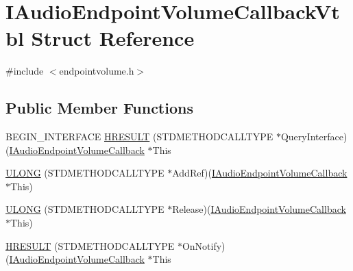 \hypertarget{struct_i_audio_endpoint_volume_callback_vtbl}{}\section{I\+Audio\+Endpoint\+Volume\+Callback\+Vtbl Struct Reference}
\label{struct_i_audio_endpoint_volume_callback_vtbl}


{\ttfamily \#include $<$endpointvolume.\+h$>$}

\subsection*{Public Member Functions}
\begin{DoxyCompactItemize}
\item 
B\+E\+G\+I\+N\+\_\+\+I\+N\+T\+E\+R\+F\+A\+CE \hyperlink{struct_i_audio_endpoint_volume_callback_vtbl_a42cdc43896d6796cbd27b764fc476684}{H\+R\+E\+S\+U\+LT} (S\+T\+D\+M\+E\+T\+H\+O\+D\+C\+A\+L\+L\+T\+Y\+PE $\ast$Query\+Interface)(\hyperlink{endpointvolume_8h_abe829f734f26a7d1a40dab04b3ebbc92}{I\+Audio\+Endpoint\+Volume\+Callback} $\ast$This
\item 
\hyperlink{struct_i_audio_endpoint_volume_callback_vtbl_a84b9bec34d0333907c01a88399b31107}{U\+L\+O\+NG} (S\+T\+D\+M\+E\+T\+H\+O\+D\+C\+A\+L\+L\+T\+Y\+PE $\ast$Add\+Ref)(\hyperlink{endpointvolume_8h_abe829f734f26a7d1a40dab04b3ebbc92}{I\+Audio\+Endpoint\+Volume\+Callback} $\ast$This)
\item 
\hyperlink{struct_i_audio_endpoint_volume_callback_vtbl_ae0a1df2d81217cea8878a5ab19dc49c8}{U\+L\+O\+NG} (S\+T\+D\+M\+E\+T\+H\+O\+D\+C\+A\+L\+L\+T\+Y\+PE $\ast$Release)(\hyperlink{endpointvolume_8h_abe829f734f26a7d1a40dab04b3ebbc92}{I\+Audio\+Endpoint\+Volume\+Callback} $\ast$This)
\item 
\hyperlink{struct_i_audio_endpoint_volume_callback_vtbl_a5571f05cb440e6c57d264ca3b163be5a}{H\+R\+E\+S\+U\+LT} (S\+T\+D\+M\+E\+T\+H\+O\+D\+C\+A\+L\+L\+T\+Y\+PE $\ast$On\+Notify)(\hyperlink{endpointvolume_8h_abe829f734f26a7d1a40dab04b3ebbc92}{I\+Audio\+Endpoint\+Volume\+Callback} $\ast$This
\end{DoxyCompactItemize}

